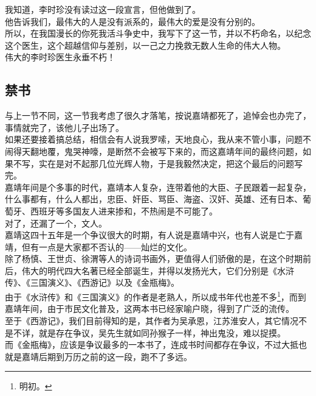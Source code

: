 \begin{multicols}{\theparacolNo}
我知道，李时珍没有读过这一段宣言，但他做到了。\\

他告诉我们，最伟大的人是没有派系的，最伟大的爱是没有分别的。\\

所以，在我国漫长的你死我活斗争史中，我写下了这一节，并以不朽命名，以纪念这个医生，这个超越信仰与差别，以一己之力挽救无数人生命的伟大人物。\\

伟大的李时珍医生永垂不朽！\\

\subsection{禁书}
与上一节不同，这一节我考虑了很久才落笔，按说嘉靖都死了，追悼会也办完了，事情就完了，该他儿子出场了。\\

如果还要接着搞总结，相信会有人说我罗嗦，天地良心，我从来不管小事，问题不闹得天翻地覆，鬼哭神嚎，是断然不会被写下来的，而这嘉靖年间的最终问题，如果不写，实在是对不起那几位光辉人物，于是我毅然决定，把这个最后的问题写完。\\

嘉靖年间是个多事的时代，嘉靖本人复杂，连带着他的大臣、子民跟着一起复杂，什么事都有，什么人都出，忠臣、奸臣、骂臣、海盗、汉奸、英雄、还有日本、葡萄牙、西班牙等多国友人进来掺和，不热闹是不可能了。\\

对了，还漏了一个，文人。\\

嘉靖这四十五年是一个争议很大的时期，有人说是嘉靖中兴，也有人说是亡于嘉靖，但有一点是大家都不否认的——灿烂的文化。\\

除了杨慎、王世贞、徐渭等人的诗词书画外，更值得人们骄傲的是，在这个时期前后，伟大的明代四大名著已经全部诞生，并得以发扬光大，它们分别是《水浒传》、《三国演义》、《西游记》以及《金瓶梅》。\\

由于《水浒传》和《三国演义》的作者是老熟人，所以成书年代也差不多\footnote{明初。}，而到嘉靖年间，由于市民文化普及，这两本书已经家喻户晓，得到了广泛的流传。\\

至于《西游记》，我们目前得知的是，其作者为吴承恩，江苏淮安人，其它情况不是不详，就是存在争议，吴先生就如同孙猴子一样，神出鬼没，难以捉摸。\\

而《金瓶梅》，应该是争议最多的一本书了，连成书时间都存在争议，不过大抵也就是嘉靖后期到万历之前的这一段，跑不了多远。\\


\end{multicols}
